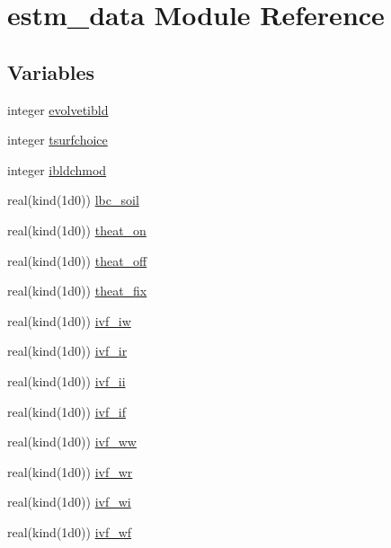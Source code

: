 \hypertarget{namespaceestm__data}{}\section{estm\+\_\+data Module Reference}
\label{namespaceestm__data}
\subsection*{Variables}
\begin{DoxyCompactItemize}
\item 
integer \hyperlink{namespaceestm__data_acff108926dd55ed2574e3a777fa82e03}{evolvetibld}
\item 
integer \hyperlink{namespaceestm__data_a006f7851647528d67a1663c4287987cb}{tsurfchoice}
\item 
integer \hyperlink{namespaceestm__data_acd010aa38e7e7891adb7711cc5b5944b}{ibldchmod}
\item 
real(kind(1d0)) \hyperlink{namespaceestm__data_a0bedfac15a2049f97e8e052918bdcf5a}{lbc\+\_\+soil}
\item 
real(kind(1d0)) \hyperlink{namespaceestm__data_afbff94a2d61692610e6181c1a557b1b6}{theat\+\_\+on}
\item 
real(kind(1d0)) \hyperlink{namespaceestm__data_a20d9fef092d33c94a656983052f17b8d}{theat\+\_\+off}
\item 
real(kind(1d0)) \hyperlink{namespaceestm__data_a0c35cb0c35299e4396912d865e3f8e99}{theat\+\_\+fix}
\item 
real(kind(1d0)) \hyperlink{namespaceestm__data_ace7c6cd6fc62d3dad2691279b6f7569c}{ivf\+\_\+iw}
\item 
real(kind(1d0)) \hyperlink{namespaceestm__data_ab659d135eedc3bab580f60e45e10ea7c}{ivf\+\_\+ir}
\item 
real(kind(1d0)) \hyperlink{namespaceestm__data_a1143a11453932046e1418817b274ca99}{ivf\+\_\+ii}
\item 
real(kind(1d0)) \hyperlink{namespaceestm__data_aa4a8abb93e606a189276a500f27cd503}{ivf\+\_\+if}
\item 
real(kind(1d0)) \hyperlink{namespaceestm__data_aae1ab3ae31af3a3a39bfc76c3ba8a3f1}{ivf\+\_\+ww}
\item 
real(kind(1d0)) \hyperlink{namespaceestm__data_ae31b6c07de2519af3d053132ab347cb4}{ivf\+\_\+wr}
\item 
real(kind(1d0)) \hyperlink{namespaceestm__data_a9d33b951364de9c96e2dfc357f5f05b6}{ivf\+\_\+wi}
\item 
real(kind(1d0)) \hyperlink{namespaceestm__data_a128bd45a4f54f0a88d5766f4279149b4}{ivf\+\_\+wf}

\end{DoxyCompactItemize}
